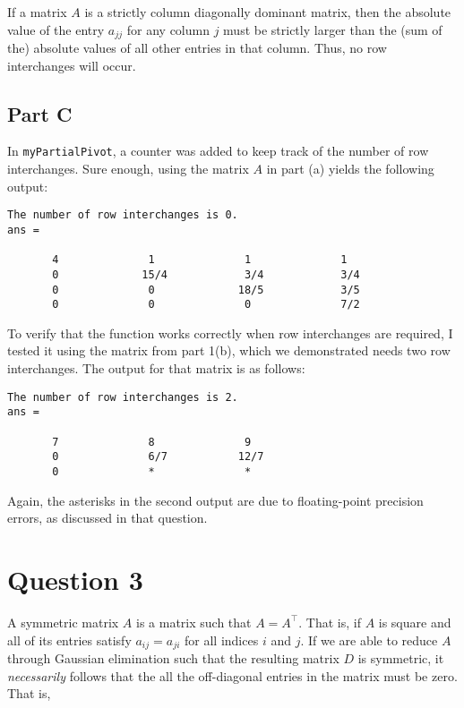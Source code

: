 \documentclass[12pt]{article}
\newcommand{\code}[1]{\texttt{#1}}
\begin{document}
If a matrix $A$ is a strictly column diagonally dominant matrix, then the absolute value of the entry $a_{jj}$ for any column $j$ must be strictly larger than the (sum of the) absolute values of all other entries in that column. Thus, no row interchanges will occur.

\subsection*{Part C}

In \code{myPartialPivot}, a counter was added to keep track of the number of row interchanges. Sure enough, using the matrix $A$ in part (a) yields the following output:

\begin{verbatim}
The number of row interchanges is 0.
ans =

       4              1              1              1       
       0             15/4            3/4            3/4     
       0              0             18/5            3/5     
       0              0              0              7/2     
\end{verbatim}

To verify that the function works correctly when row interchanges are required, I tested it using the matrix from part 1(b), which we demonstrated needs two row interchanges. The output for that matrix is as follows:

\begin{verbatim}
The number of row interchanges is 2.
ans =

       7              8              9       
       0              6/7           12/7     
       0              *              *     
\end{verbatim}

Again, the asterisks in the second output are due to floating-point precision errors, as discussed in that question.

\section*{Question 3}

A symmetric matrix $A$ is a matrix such that $A=A^\top$. That is, if $A$ is square and all of its entries satisfy $a_{ij}=a_{ji}$ for all indices $i$ and $j$. If we are able to reduce $A$ through Gaussian elimination such that the resulting matrix $D$ is symmetric, it \textit{necessarily} follows that the all the off-diagonal entries in the matrix must be zero. That is,
\end{document}
